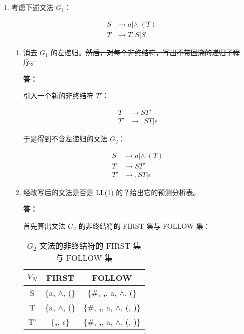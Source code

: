 \begin{enumerate}
    \item 考虑下述文法 $G_1$：
    
    \begin{align*}
        S & \to a | \wedge | (T) \\
        T & \to T,S | S
    \end{align*}
    
    \begin{enumerate}
        \item 消去 $G_1$ 的左递归。\sout{然后，对每个非终结符，写出不带回溯的递归子程序。}
        
        \textbf{答：}
        
        引入一个新的非终结符 $T'$：
        
        \begin{align*}
            T & \to ST' \\
            T' & \to ,ST | \epsilon
        \end{align*}
        
        于是得到不含左递归的文法 $G_2$：
        
        \begin{align*}
            S & \to a | \wedge | (T) \\
            T & \to ST' \\
            T' & \to ,ST | \epsilon
        \end{align*}
        
        \item 经改写后的文法是否是 LL(1) 的？给出它的预测分析表。
        
        \textbf{答：}
        
        首先算出文法 $G_2$ 的非终结符的 FIRST 集与 FOLLOW 集：
        
        \begin{table}[H]
            \centering
            \begin{tabular}{|c|c|c|}
                \hline
                $V_N$ & FIRST & FOLLOW \\
                \hline
                S & \{a, $\wedge$, (\} & \{\#, \textbf{,}, a, $\wedge$, (\} \\
                \hline
                T & \{a, $\wedge$, (\} & \{\#, \textbf{,}, a, $\wedge$, (, )\} \\
                \hline
                T' & \{\textbf{,}, $\epsilon$\} & \{\#, \textbf{,}, a, $\wedge$, (, )\} \\
                \hline
            \end{tabular}
            \caption{$G_2$ 文法的非终结符的 FIRST 集与 FOLLOW 集}
            \label{tab:FF1}
        \end{table}
        

\end{enumerate}
\end{enumerate}
